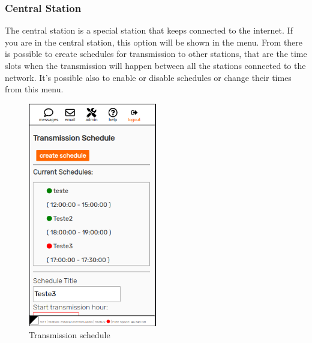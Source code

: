 \documentclass[11pt,a4paper]{article}
\begin{document}
\subsubsection{Central Station} 
\label{gui_central_station}

The central station is a special station that keeps connected to the internet. If you are in the central station, this option will be shown in the menu. From there is possible to create schedules for transmission to other stations, that are the time slots when the transmission will happen between all the stations connected to the network. It's possible also to enable or disable schedules or change their times from this menu.

\begin{figure}[H]
    \centering
    \includegraphics[width=0.5\textwidth]{screenshots/frontend/en/central.png}
    \caption{Transmission schedule}
	\vspace{-10pt}
    \label{fig:central}
\end{figure} 
\end{document}
